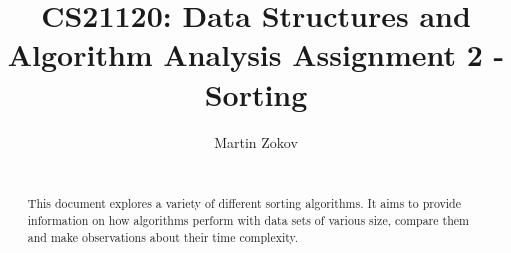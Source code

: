 \documentclass{acm_proc_article-sp}
\begin{document}
\title{CS21120: Data Structures and Algorithm Analysis
Assignment 2 - Sorting}
%
%
%
%
%

%
\author{
%
%
\alignauthor
Martin Zokov\\
       \\
       }


\maketitle
\begin{abstract}
This document explores a variety of different sorting algorithms. It aims to provide information on how algorithms perform with data sets of various size,
compare them and make observations about their time complexity.
\end{abstract}
\end{document}
